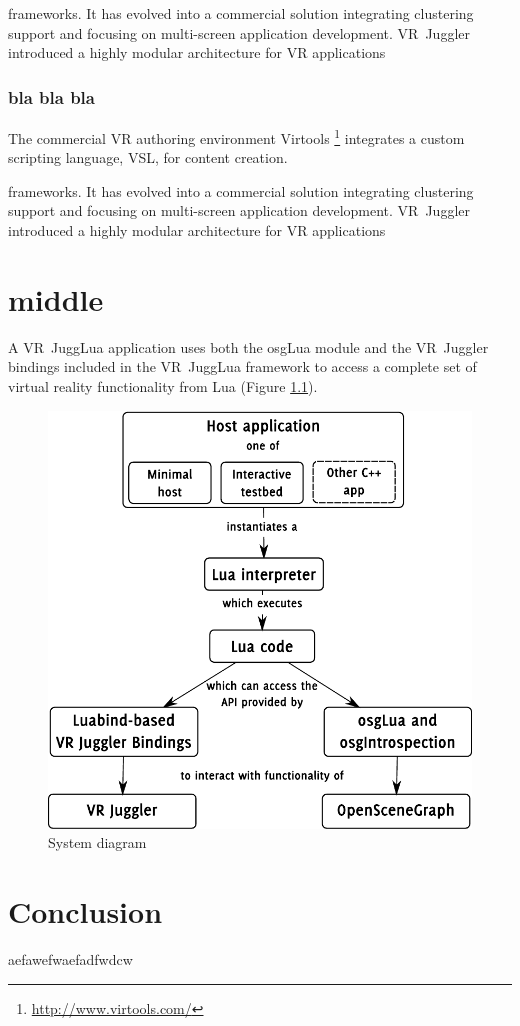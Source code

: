 \documentclass[capstoc,capschap,draftcls]{rpisudiss}
\begin{document}
frameworks. It has evolved into a commercial solution integrating
clustering support and focusing on multi-screen application development.
VR~Juggler introduced a highly modular architecture for VR applications

\subsection{bla bla bla}
The commercial
VR authoring environment Virtools%
\footnote{\url{http://www.virtools.com/}%
} integrates a custom scripting language, VSL, for content creation.

frameworks. It has evolved into a commercial solution integrating
clustering support and focusing on multi-screen application development.
VR~Juggler introduced a highly modular architecture for VR applications
\chapter{middle}

A VR~JuggLua application uses both the osgLua module
and the VR~Juggler bindings included in the VR~JuggLua framework
to access a complete set of virtual reality functionality from Lua
(Figure \ref{fig:System-diagram}).
\begin{figure}
    \centering
    \includegraphics[width=1\columnwidth]{accessdiagram}
    \caption{\label{fig:System-diagram}System diagram}
\end{figure}


\chapter{Conclusion}

aefawefwaefadfwdcw




\end{document}
